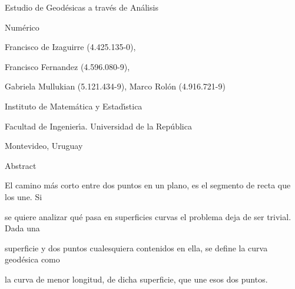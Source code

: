 \documentclass[a4paper,portrait,12pt]{article}
\begin{document}
\begin{flushleft}
Estudio de Geodésicas a través de Análisis
\end{flushleft}


\begin{flushleft}
Numérico
\end{flushleft}


\begin{flushleft}
Francisco de Izaguirre (4.425.135-0),
\end{flushleft}


\begin{flushleft}
Francisco Fernandez (4.596.080-9),
\end{flushleft}


\begin{flushleft}
Gabriela Mullukian (5.121.434-9), Marco Rolón (4.916.721-9)
\end{flushleft}


\begin{flushleft}
Instituto de Matemática y Estad\i{}́stica
\end{flushleft}


\begin{flushleft}
Facultad de Ingenier\i{}́a. Universidad de la República
\end{flushleft}


\begin{flushleft}
Montevideo, Uruguay
\end{flushleft}





\begin{flushleft}
Abstract
\end{flushleft}


\begin{flushleft}
El camino más corto entre dos puntos en un plano, es el segmento de recta que los une. Si
\end{flushleft}


\begin{flushleft}
se quiere analizar qué pasa en superficies curvas el problema deja de ser trivial. Dada una
\end{flushleft}


\begin{flushleft}
superficie y dos puntos cualesquiera contenidos en ella, se define la curva geodésica como
\end{flushleft}


\begin{flushleft}
la curva de menor longitud, de dicha superficie, que une esos dos puntos.
\end{flushleft}
\end{document}
